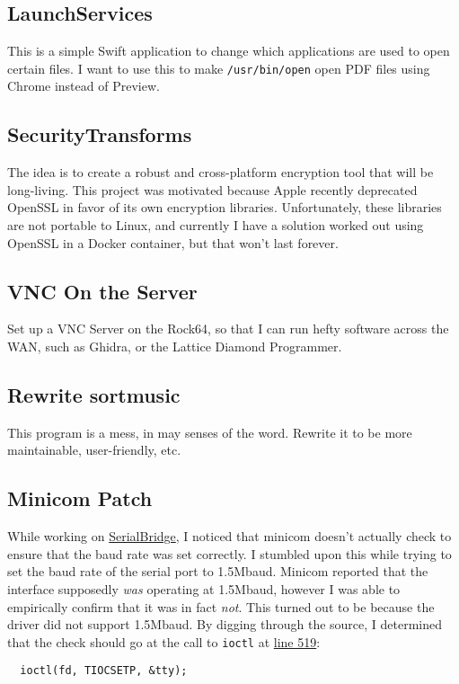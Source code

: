 \documentclass{designdoc}
\begin{document}
\subsection*{LaunchServices}
This is a simple Swift application to change which applications are used to
open certain files. I want to use this to make \texttt{/usr/bin/open} open
PDF files using Chrome instead of Preview.

\subsection*{SecurityTransforms}
The idea is to create a robust and cross-platform encryption tool that will be
long-living. This project was motivated because Apple recently deprecated
OpenSSL in favor of its own encryption libraries. Unfortunately, these
libraries are not portable to Linux, and currently I have a solution worked out
using OpenSSL in a Docker container, but that won't last forever.

\subsection*{VNC On the Server}
Set up a VNC Server on the Rock64, so that I can run hefty software across the
WAN, such as Ghidra, or the Lattice Diamond Programmer.

\subsection*{Rewrite sortmusic}
This program is a mess, in may senses of the word. Rewrite it to be more
maintainable, user-friendly, etc.

\subsection*{Minicom Patch}
While working on
\href{https://github.com/AmateurECE/SerialBridge}{SerialBridge}, I noticed that
minicom doesn't actually check to ensure that the baud rate was set correctly.
I stumbled upon this while trying to set the baud rate of the serial port to
1.5Mbaud. Minicom reported that the interface supposedly \textit{was} operating
at 1.5Mbaud, however I was able to empirically confirm that it was in fact
\textit{not}. This turned out to be because the driver did not support
1.5Mbaud. By digging through the source, I determined that the check should go
at the call to \texttt{ioctl} at
\href{https://github.com/Distrotech/minicom/blob/54202fe0ea8510dc8fcd23ab49d39%
  d3d8cb2e529/src/sysdep1.c#L519}{line 519}:
\begin{verbatim}
  ioctl(fd, TIOCSETP, &tty);
\end{verbatim}
\end{document}
